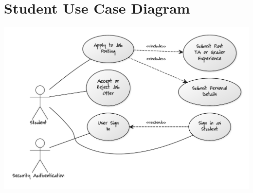 \documentclass[12pt]{report}
\begin{document}
\section{Student Use Case Diagram}
\includegraphics[scale=0.5]{model/Diagrams/UC/studentUC}
\end{document}
